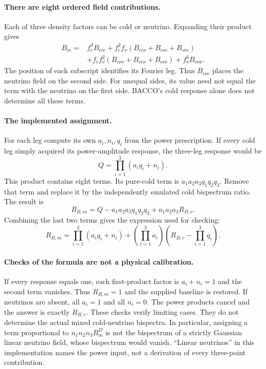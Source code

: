 \documentclass[11pt]{article}
\begin{document}
\paragraph{There are eight ordered field contributions.}
Each of three density factors can be cold or neutrino. Expanding their
product gives
\begin{equation}
\begin{split}
 B_m={}&f_c^3B_{ccc}
 +f_c^2f_\nu(B_{cc\nu}+B_{c\nu c}+B_{\nu cc})\\
 &+f_cf_\nu^2(B_{c\nu\nu}+B_{\nu c\nu}+B_{\nu\nu c})
 +f_\nu^3B_{\nu\nu\nu}.
\end{split}
\end{equation}
The position of each subscript identifies its Fourier leg. Thus
$B_{c\nu c}$ places the neutrino field on the second side. For unequal
sides, its value need not equal the term with the neutrino on the first
side. BACCO's cold response alone does not determine all these terms.

\paragraph{The implemented assignment.}
For each leg compute its own $a_i,n_i,q_i$ from the power prescription.
If every cold leg simply acquired its power-amplitude response, the
three-leg response would be
\begin{equation}
 Q=\prod_{i=1}^3(a_iq_i+n_i).
\end{equation}
This product contains eight terms. Its pure-cold term is
$a_1a_2a_3q_1q_2q_3$. Remove that term and replace it by the independently
emulated cold bispectrum ratio. The result is
\begin{equation}
 R_{B,m}=Q-a_1a_2a_3q_1q_2q_3+a_1a_2a_3R_{B,c}.
\end{equation}
Combining the last two terms gives the expression used for checking:
\begin{equation}
 R_{B,m}=\prod_{i=1}^3(a_iq_i+n_i)
 +\left(\prod_{i=1}^3a_i\right)
  \left(R_{B,c}-\prod_{i=1}^3q_i\right).
\end{equation}

\paragraph{Checks of the formula are not a physical calibration.}
If every response equals one, each first-product factor is $a_i+n_i=1$
and the second term vanishes. Thus $R_{B,m}=1$ and the supplied baseline is
restored. If neutrinos are absent, all $a_i=1$ and all $n_i=0$. The power
products cancel and the answer is exactly $R_{B,c}$. These checks verify
limiting cases. They do not determine the actual mixed cold-neutrino
bispectra. In particular, assigning a term proportional to
$n_1n_2n_3B_m^D$ is not the bispectrum of a strictly Gaussian linear
neutrino field, whose bispectrum would vanish. ``Linear neutrinos'' in
this implementation names the power input, not a derivation of every
three-point contribution.
\end{document}
